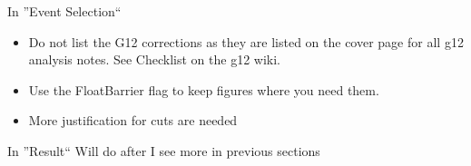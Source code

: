 \documentclass[10pt,a4paper]{report}
\begin{document}
	In ''Event Selection``
	\begin{itemize}
		\item Do not list the G12 corrections as they are listed on the cover page for all g12 analysis notes. See Checklist on the g12 wiki.
		\item Use the FloatBarrier flag to keep figures where you need them.
		\item More justification for cuts are needed
	\end{itemize}
	In ''Result``
	Will do after I see more in previous sections
\end{document}
